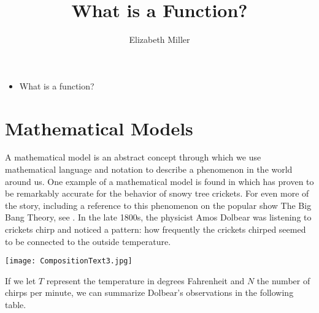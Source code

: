 \documentclass[noauthor, nooutcomes]{ximera}
\author{Elizabeth Miller}
\title{What is a Function?}
\begin{document}
\begin{abstract}
  
\end{abstract}
\licenseAPCSZORCCA
\maketitle



\begin{motivatingQuestions}\begin{itemize}
\item What is a function?
\end{itemize}\end{motivatingQuestions}



\section{Mathematical Models}
A mathematical model is an abstract concept through which we use mathematical language and notation to describe a phenomenon in the world around us.  One example of a mathematical model is found in  which has proven to be remarkably accurate for the behavior of snowy tree crickets.  For even more of the story, including a reference to this phenomenon on the popular show The Big Bang Theory, see .  In the late 1800s, the physicist Amos Dolbear was listening to crickets chirp and noticed a pattern: how frequently the crickets chirped seemed to be connected to the outside temperature.  

\begin{image}
\texttt{[image: CompositionText3.jpg]}
\end{image}

If we let $T$ represent the temperature in degrees Fahrenheit and $N$ the number of chirps per minute, we can summarize Dolbear's observations in the following table.
\end{document}
